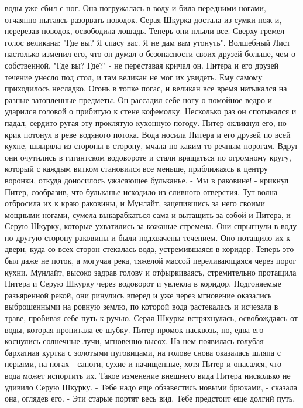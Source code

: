 воды уже сбил с ног. Она погружалась в воду и била передними ногами, 
отчаянно пытаясь разорвать поводок. Серая Шкурка достала из сумки нож 
и, перерезав поводок, освободила лошадь.
    Теперь они плыли все. Сверху гремел голос великана: "Где вы? Я 
спасу вас. Я не дам вам утонуть". Волшебный Лист настолько изменил 
его, что он думал о безопасности своих друзей больше, чем о 
собственной. "Где вы? Где?" - не переставая кричал он.
    Питера и его друзей течение унесло под стол, и там великан не мог 
их увидеть. Ему самому приходилось несладко. Огонь в топке погас, и 
великан все время натыкался на разные затопленные предметы. Он 
рассадил себе ногу о помойное ведро и ударился головой о прибитую к 
стене кофемолку. Несколько раз он спотыкался и падал, сердито ругая 
эту проклятую кухонную погоду.
    Питер окликнул его, но крик потонул в реве водяного потока. Вода 
носила Питера и его друзей по всей кухне, швыряла из стороны в 
сторону, мчала по каким-то речным порогам. Вдруг они очутились в 
гигантском водовороте и стали вращаться по огромному кругу, который с 
каждым витком становился все меньше, приближаясь к центру воронки, 
откуда доносилось ужасающее бульканье.
    - Мы в раковине! - крикнул Питер, сообразив, что бульканье 
исходило из сливного отверстия. Тут волна отбросила их к краю 
раковины, и Мунлайт, зацепившись за него своими мощными ногами, сумела 
выкарабкаться сама и вытащить за собой и Питера, и Серую Шкурку, 
которые ухватились за кожаные стремена. Они спрыгнули в воду по другую 
сторону раковины и были подхвачены течением. Оно потащило их к двери, 
куда со всех сторон стекалась вода, устремившаяся в коридор.
    Теперь это был даже не поток, а могучая река, тяжелой массой 
переливающаяся через порог кухни. Мунлайт, высоко задрав голову и 
отфыркиваясъ, стремительно протащила Питера и Серую Шкурку через 
водоворот и увлекла в коридор. Подгоняемые разъяренной рекой, они 
ринулись вперед и уже через мгновение оказались выброшенными на ровную 
землю, по которой вода растекалась и исчезала в траве, пробивая себе 
путь к ручью.
    Серая Шкурка встряхнулась, освобождаясь от воды, которая пропитала 
ее шубку. Питер промок насквозь, но, едва его коснулись солнечные 
лучи, мгновенно высох. На нем появилась голубая бархатная куртка с 
золотыми пуговицами, на голове снова оказалась шляпа с перьями, на 
ногах - сапоги, сухие и начищенные, хотя Питер и опасался, что вода 
может испортить их.
    Такое изменение внешнего вида Питера нисколько не удивило Серую 
Шкурку.
    - Тебе надо еще обзавестись новыми брюками, - сказала она, оглядев 
его. - Эти старые портят весь вид. Тебе предстоит еще долгий путь, 
